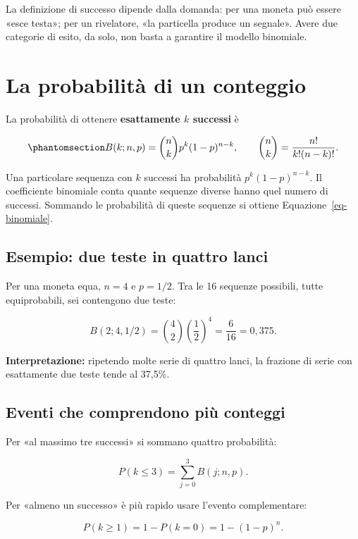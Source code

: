 \documentclass[
  italian,
  letterpaper,
  DIV=11,
  numbers=noendperiod]{scrreprt}
\begin{document}
La definizione di successo dipende dalla domanda: per una moneta può
essere «esce testa»; per un rivelatore, «la particella produce un
segnale». Avere due categorie di esito, da solo, non basta a garantire
il modello binomiale.

\section{La probabilità di un
conteggio}\label{la-probabilituxe0-di-un-conteggio}

La probabilità di ottenere \textbf{esattamente \(k\) successi} è

\begin{equation}\protect\phantomsection\label{eq-binomiale}{
B(k;n,p)=\binom{n}{k}p^k(1-p)^{n-k},
\qquad \binom{n}{k}=\frac{n!}{k!(n-k)!}.
}\end{equation}

Una particolare sequenza con \(k\) successi ha probabilità
\(p^k(1-p)^{n-k}\). Il coefficiente binomiale conta quante sequenze
diverse hanno quel numero di successi. Sommando le probabilità di queste
sequenze si ottiene Equazione~\ref{eq-binomiale}.

\subsection{Esempio: due teste in quattro
lanci}\label{esempio-due-teste-in-quattro-lanci}

Per una moneta equa, \(n=4\) e \(p=1/2\). Tra le 16 sequenze possibili,
tutte equiprobabili, sei contengono due teste:

\[
B(2;4,1/2)=\binom{4}{2}\left(\frac12\right)^4
=\frac{6}{16}=0{,}375.
\]

\textbf{Interpretazione:} ripetendo molte serie di quattro lanci, la
frazione di serie con esattamente due teste tende al 37,5\%.

\subsection{Eventi che comprendono più
conteggi}\label{eventi-che-comprendono-piuxf9-conteggi}

Per «al massimo tre successi» si sommano quattro probabilità:

\[
P(k\leq 3)=\sum_{j=0}^{3}B(j;n,p).
\]

Per «almeno un successo» è più rapido usare l'evento complementare:

\[
P(k\geq1)=1-P(k=0)=1-(1-p)^n.
\]
\end{document}
